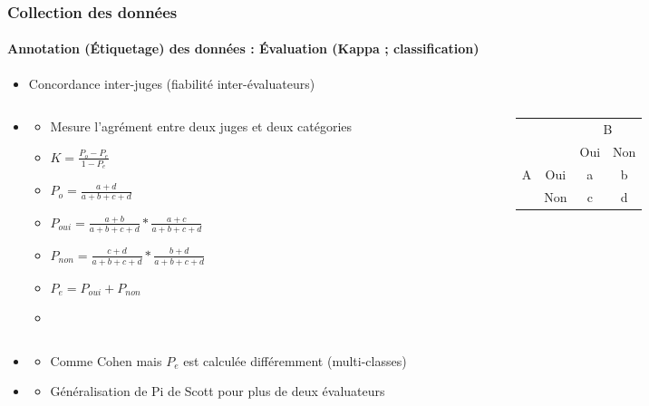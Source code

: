 \documentclass[xcolor=table]{beamer}
\begin{document}
\begin{frame}
	\frametitle{Collection des données}
	\framesubtitle{Annotation (Étiquetage) des données : Évaluation (Kappa ; classification)}
	
	\begin{itemize}
		\item Concordance inter-juges (fiabilité inter-évaluateurs) 
	\end{itemize}

\begin{columns}
\begin{column}{0.6\textwidth}
	\begin{itemize}
		\item {}
		\begin{itemize}
			\item Mesure l'agrément entre deux juges et deux catégories
			\item $K = \frac{P_o - P_e}{1 - P_e}$
			\item $P_o = \frac{a + d}{a+b+c+d}$
			\item $P_{oui} = \frac{a+b}{a+b+c+d} * \frac{a+c}{a+b+c+d}$
			\item $P_{non} = \frac{c+d}{a+b+c+d} * \frac{b+d}{a+b+c+d}$
			\item $P_e = P_{oui} + P_{non}$
			\item {}
		\end{itemize}
	\end{itemize}
\end{column}
\begin{column}{0.4\textwidth}
	\begin{tabular}{|c|c|c|c|}
		\cline{3-4}
		\multicolumn{2}{c|}{}& \multicolumn{2}{c|}{B} \\
		\cline{3-4}
		\multicolumn{2}{c|}{}& Oui & Non \\
		\hline
		\multirow{2}{*}{A} & Oui & a & b \\
		\cline{2-4}
		& Non & c & d \\
		\hline
	\end{tabular}
\end{column}
\end{columns}

\begin{itemize}
	\item {}
	\begin{itemize}
		\item Comme Cohen mais $P_e$ est calculée différemment (multi-classes)
	\end{itemize}
	\item {}
	\begin{itemize}
		\item Généralisation de Pi de Scott pour plus de deux évaluateurs
	\end{itemize}
\end{itemize}

\end{frame}
\end{document}
